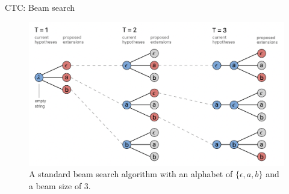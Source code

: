\begin{frame}{CTC: Beam search}
    \begin{figure}
    	\centering
    	\includegraphics[width=0.9\linewidth]{figs/beam_search.png}
    	\caption{A standard beam search algorithm with an alphabet of $\{\epsilon, a, b\}$ and a beam size of 3.}

    \end{figure}
\end{frame}


